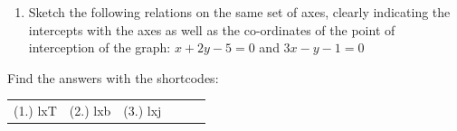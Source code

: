 \begin{enumerate}[noitemsep, label=\textbf{\arabic*}. ]
\begin{figure}[H]
\begin{center}
      \vspace{2pt}
    \vspace{.1in}
    
    \end{center}

 \end{figure}   

    \addtocounter{footnote}{-0}
            \label{m39338*uid100}\item Sketch the following relations on the same set of axes, clearly indicating the intercepts with the axes as well as the co-ordinates of the point of interception of the graph:
\begin{math}x+2y-5=0\end{math} and \begin{math}3x-y-1=0\end{math}\newline
            \end{enumerate}
        
          

        
      

  \label{m39338**end}
          
\par {} Find the answers with the shortcodes:
 \par \begin{tabular}[h]{cccccc}
 (1.) lxT  &  (2.) lxb  &  (3.) lxj  & \end{tabular}

% 
%     
%     
%     
    
   \par 
    
